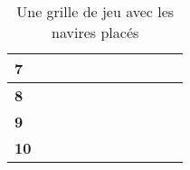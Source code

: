 \begin{table}[h]
\begin{tabular}{|l|l|l|l|l|l|l|l|l|l|l|}
\textbf{7}  &            &            & \cellcolor[HTML]{000000} & \cellcolor[HTML]{000000} & \cellcolor[HTML]{000000}{\color[HTML]{000000} } & \cellcolor[HTML]{000000}{\color[HTML]{000000} } & \cellcolor[HTML]{000000}{\color[HTML]{000000} } &                                                 &            & \cellcolor[HTML]{000000}                        \\ \hline
\textbf{8}  &            &            &                          &                          &                                                 &                                                 &                                                 &                                                 &            &                                                 \\ \hline
\textbf{9}  &            &            & \cellcolor[HTML]{000000} & \cellcolor[HTML]{000000} & \cellcolor[HTML]{000000}                        &                                                 &                                                 &                                                 &            &                                                 \\ \hline
\textbf{10} &            &            &                          &                          &                                                 &                                                 &                                                 &                                                 &            &                                                 \\ \hline
\end{tabular}
\caption {Une grille de jeu avec les navires plac\'es}
\end{table}
